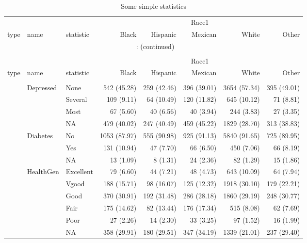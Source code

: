 \documentclass{article}
\begin{document}
\endgroup
\newpage
\hypertarget{Some simple statistics}{} 
\begingroup\footnotesize\begin{longtable}{lllrrrrr}
\caption{Some simple statistics}\\
\toprule
&&&
\multicolumn{ 5 }{c}{ Race1 } \\
\cmidrule(lr){4-8}
type & name & statistic & Black & Hispanic & Mexican & White & Other \\
\hline
\endfirsthead
\multicolumn{8}{c}{\tablename~\thetable{}: (continued)}\\\\
\toprule
&&&
\multicolumn{ 5 }{c}{ Race1 } \\
\cmidrule(lr){4-8}
type & name & statistic & Black & Hispanic & Mexican & White & Other \\
\hline
\endhead \hline \endfoot \hline
\endlastfoot
\multicolumn{ 7 }{l}{\textit{ categorical }}\\
& Depressed & None & 542  (45.28) & 259  (42.46) & 396  (39.01) & 3654 (57.34) & 395  (49.01) \\
 &  & Several & 109  (9.11) & 64   (10.49) & 120  (11.82) & 645  (10.12) & 71   (8.81) \\
 &  & Most & 67   (5.60) & 40   (6.56) & 40   (3.94) & 244  (3.83) & 27   (3.35) \\
 &  & NA & 479  (40.02) & 247  (40.49) & 459  (45.22) & 1829 (28.70) & 313  (38.83) \\
[2ex]
 & Diabetes & No & 1053 (87.97) & 555  (90.98) & 925  (91.13) & 5840 (91.65) & 725  (89.95) \\
 &  & Yes & 131  (10.94) & 47   (7.70) & 66   (6.50) & 450  (7.06) & 66   (8.19) \\
 &  & NA & 13   (1.09) & 8    (1.31) & 24   (2.36) & 82   (1.29) & 15   (1.86) \\
[2ex]
 & HealthGen & Excellent & 79   (6.60) & 44   (7.21) & 48   (4.73) & 643  (10.09) & 64   (7.94) \\
 &  & Vgood & 188  (15.71) & 98   (16.07) & 125  (12.32) & 1918 (30.10) & 179  (22.21) \\
 &  & Good & 370  (30.91) & 192  (31.48) & 286  (28.18) & 1860 (29.19) & 248  (30.77) \\
 &  & Fair & 175  (14.62) & 82   (13.44) & 176  (17.34) & 515  (8.08) & 62   (7.69) \\
 &  & Poor & 27   (2.26) & 14   (2.30) & 33   (3.25) & 97   (1.52) & 16   (1.99) \\
 &  & NA & 358  (29.91) & 180  (29.51) & 347  (34.19) & 1339 (21.01) & 237  (29.40) \\

\end{longtable}
\end{document}
